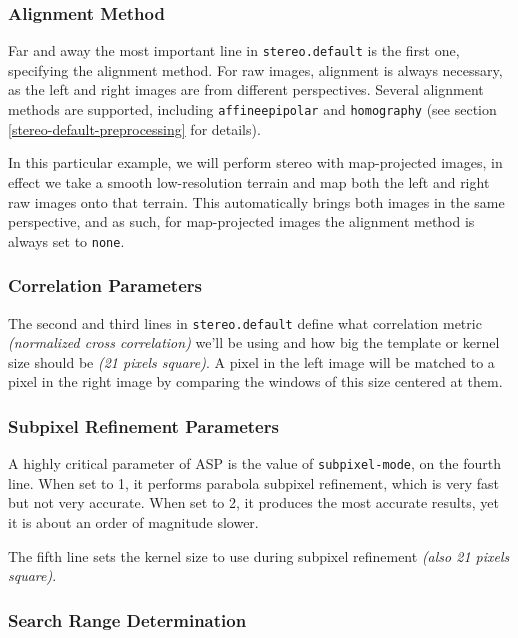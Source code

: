\subsubsection*{Alignment Method}

Far and away the most important line in \texttt{stereo.default} is the
first one, specifying the alignment method. For raw images, alignment is
always necessary, as the left and right images are from different
perspectives. Several alignment methods are supported, including
\texttt{affineepipolar} and \texttt{homography} (see section 
\ref{stereo-default-preprocessing} for details). 

In this particular example, we will perform stereo with map-projected
images, in effect we take a smooth low-resolution terrain and map both
the left and right raw images onto that terrain. This automatically
brings both images in the same perspective, and as such, for
map-projected images the alignment method is always set to
\texttt{none}.

\subsubsection*{Correlation Parameters}

The second and third lines in \texttt{stereo.default} define what
correlation metric \textit{(normalized cross correlation)} we'll be
using and how big the template or kernel size should be \textit{(21
pixels square)}. A pixel in the left image will be matched to a pixel in
the right image by comparing the windows of this size centered at them.


\subsubsection*{Subpixel Refinement Parameters}

A highly critical parameter of \ac{ASP} is the value of
\texttt{subpixel-mode}, on the fourth line. When set to 1, it performs
parabola subpixel refinement, which is very fast but not very
accurate. When set to 2, it produces the most accurate results, yet it
is about an order of magnitude slower.

The fifth line sets the kernel size to use during subpixel refinement
\textit{(also 21 pixels square)}.

\subsubsection*{Search Range Determination}


